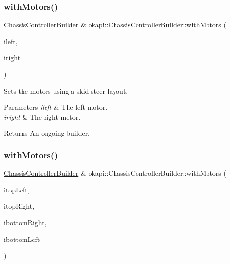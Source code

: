 \subsubsection{\texorpdfstring{withMotors()}{withMotors()}\hspace{0.1cm}{\footnotesize\ttfamily [3/6]}}
{\footnotesize\ttfamily \mbox{\hyperlink{classokapi_1_1ChassisControllerBuilder}{Chassis\+Controller\+Builder}} \& okapi\+::\+Chassis\+Controller\+Builder\+::with\+Motors (\begin{DoxyParamCaption}\item[{const std\+::shared\+\_\+ptr$<$ \mbox{\hyperlink{classokapi_1_1AbstractMotor}{Abstract\+Motor}} $>$ \&}]{ileft,  }\item[{const std\+::shared\+\_\+ptr$<$ \mbox{\hyperlink{classokapi_1_1AbstractMotor}{Abstract\+Motor}} $>$ \&}]{iright }\end{DoxyParamCaption})}

Sets the motors using a skid-\/steer layout.


\begin{DoxyParams}{Parameters}
{\em ileft} & The left motor. \\
\hline
{\em iright} & The right motor. \\
\hline
\end{DoxyParams}
\begin{DoxyReturn}{Returns}
An ongoing builder. 
\end{DoxyReturn}
\mbox{\label{classokapi_1_1ChassisControllerBuilder_a0d0a144c1b600aa90cf19b6a76a7dd04}} 
\subsubsection{\texorpdfstring{withMotors()}{withMotors()}\hspace{0.1cm}{\footnotesize\ttfamily [4/6]}}
{\footnotesize\ttfamily \mbox{\hyperlink{classokapi_1_1ChassisControllerBuilder}{Chassis\+Controller\+Builder}} \& okapi\+::\+Chassis\+Controller\+Builder\+::with\+Motors (\begin{DoxyParamCaption}\item[{const \mbox{\hyperlink{classokapi_1_1Motor}{Motor}} \&}]{itop\+Left,  }\item[{const \mbox{\hyperlink{classokapi_1_1Motor}{Motor}} \&}]{itop\+Right,  }\item[{const \mbox{\hyperlink{classokapi_1_1Motor}{Motor}} \&}]{ibottom\+Right,  }\item[{const \mbox{\hyperlink{classokapi_1_1Motor}{Motor}} \&}]{ibottom\+Left }\end{DoxyParamCaption})}

